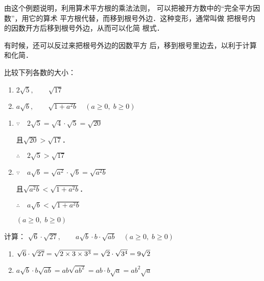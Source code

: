 由这个例题说明，利用算术平方根的乘法法则，
可以把被开方数中的“完全平方因数”，用它的算术
平方根代替，而移到根号外边．这种变形，通常叫做
把根号内的因数开方后移到根号外边，从而可以化简
根式．

有时候，还可以反过来把根号外边的因数平方
后，移到根号里边去，以利于计算和化简．
    
\begin{example}
    比较下列各数的大小：
\begin{enumerate}
    \item $2\sqrt{5},\qquad \sqrt{17}$
   \item $a\sqrt{b},\qquad \sqrt{1+a^2b}\quad  (a\ge0,\; b\ge0)$
\end{enumerate}
\end{example}

\begin{solution}
    \begin{multicols}{2}
        \begin{enumerate}
    \item $\because\quad 2\sqrt{5}=\sqrt{4}\cdot \sqrt{5}=\sqrt{20}$
    
    且$\sqrt{20}>\sqrt{17}$．
   
   $\therefore\quad  2\sqrt{5}>\sqrt{17}$

    \item $\because\quad a\sqrt{b}=\sqrt{a^2}\cdot \sqrt{b}=\sqrt{a^2b}$
    
    且$\sqrt{a^2b}<\sqrt{1+a^2b}$．

   $\therefore\quad  a\sqrt{b}<\sqrt{1+a^2b}$
   
   $(a\ge 0,\; b\ge 0)$
\end{enumerate}  
    \end{multicols}
  
\end{solution}

\begin{example}
    计算：
$\sqrt{6}\cdot \sqrt{27},\qquad a\sqrt{b}\cdot b\cdot \sqrt{ab}\quad  (a\ge0,\; b\ge0)$
\end{example}

\begin{solution}
\begin{enumerate}
    \item $\sqrt{6}\cdot \sqrt{27}=\sqrt{2\times3\times3^3}=\sqrt{2}\cdot \sqrt{3^4}=9\sqrt{2}$
    \item $a\sqrt{b}\cdot b \sqrt{ab}=ab\sqrt{ab^2}=ab\cdot b\sqrt{a}=ab^2\sqrt{a}$
\end{enumerate}
\end{solution}

